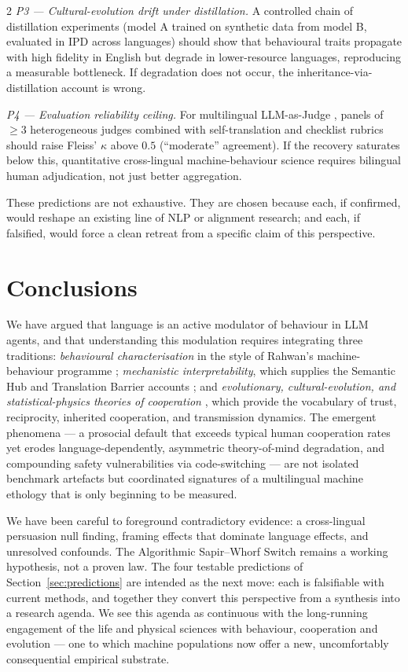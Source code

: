 \documentclass[openacc]{rsproca_new}
\begin{document}
\begin{multicols}{2}
\emph{P3 --- Cultural-evolution drift under distillation.} A controlled chain of distillation experiments (model A trained on synthetic data from model B, evaluated in IPD across languages) should show that behavioural traits propagate with high fidelity in English but degrade in lower-resource languages, reproducing a measurable bottleneck. If degradation does not occur, the inheritance-via-distillation account is wrong.

\emph{P4 --- Evaluation reliability ceiling.} For multilingual LLM-as-Judge \cite{fu2025multilingualjudge}, panels of $\geq 3$ heterogeneous judges combined with self-translation and checklist rubrics should raise Fleiss' $\kappa$ above $0.5$ (``moderate'' agreement). If the recovery saturates below this, quantitative cross-lingual machine-behaviour science requires bilingual human adjudication, not just better aggregation.

These predictions are not exhaustive. They are chosen because each, if confirmed, would reshape an existing line of NLP or alignment research; and each, if falsified, would force a clean retreat from a specific claim of this perspective.

\section{Conclusions}

We have argued that language is an active modulator of behaviour in LLM agents, and that understanding this modulation requires integrating three traditions: \emph{behavioural characterisation} in the style of Rahwan's machine-behaviour programme \cite{rahwan2019machinebehaviour}; \emph{mechanistic interpretability}, which supplies the Semantic Hub and Translation Barrier accounts \cite{wu2024semantichub, bafna2025translationbarrier}; and \emph{evolutionary, cultural-evolution, and statistical-physics theories of cooperation} \cite{axelrod1984evolution, boyd1985culture, henrich2016secret, han2022emergent, perc2017statistical}, which provide the vocabulary of trust, reciprocity, inherited cooperation, and transmission dynamics. The emergent phenomena --- a prosocial default that exceeds typical human cooperation rates yet erodes language-dependently, asymmetric theory-of-mind degradation, and compounding safety vulnerabilities via code-switching --- are not isolated benchmark artefacts but coordinated signatures of a multilingual machine ethology that is only beginning to be measured.

We have been careful to foreground contradictory evidence: a cross-lingual persuasion null finding, framing effects that dominate language effects, and unresolved confounds. The Algorithmic Sapir--Whorf Switch remains a working hypothesis, not a proven law. The four testable predictions of Section~\ref{sec:predictions} are intended as the next move: each is falsifiable with current methods, and together they convert this perspective from a synthesis into a research agenda. We see this agenda as continuous with the long-running engagement of the life and physical sciences with behaviour, cooperation and evolution --- one to which machine populations now offer a new, uncomfortably consequential empirical substrate.


\end{multicols}
\end{document}
